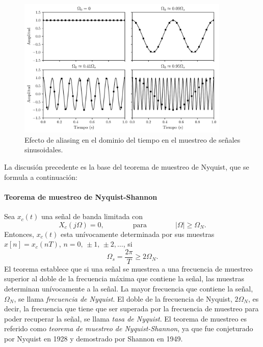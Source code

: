 \documentclass[a4paper]{report}
\begin{document}
\begin{figure}[!htb]
 \begin{center}
 \includegraphics[width=0.9\textwidth]{figuras/sampling_aliasing_sinusoid_time_domain.pdf}
 \caption{\label{fig:sampling_aliasing_sinusoid_time_domain} Efecto de aliasing en el dominio del tiempo en el muestreo de señales sinusoidales.}
 \end{center}
\end{figure} 

La discusión precedente es la base del teorema de muestreo de Nyquist, que se formula a continuación:

\paragraph{Teorema de muestreo de Nyquist-Shannon} Sea \(x_c(t)\) una señal de banda limitada con
\[
 X_c(j\Omega)=0,
 \qquad\qquad\textrm{para}\qquad\qquad
 |\Omega|\geq \Omega_N.
\]
Entonces, \(x_c(t)\) esta unívocamente determinada por sus muestras \(x[n]=x_c(nT)\), \(n=0,\,\pm1,\,\pm2,\dots\), si
\[
 \Omega_s=\frac{2\pi}{T}\geq 2\Omega_N.
\]
El teorema establece que si una señal se muestrea a una frecuencia de muestreo superior al doble de la frecuencia máxima que contiene la señal, las muestras determinan unívocamente a la señal. La mayor frecuencia que contiene la señal, \(\Omega_N\), se llama \emph{frecuencia de Nyquist}. El doble de la frecuencia de Nyquist, \(2\Omega_N\), es decir, la frecuencia que tiene que ser superada por la frecuencia de muestreo para poder recuperar la señal, se llama \emph{tasa de Nyquist}. El teorema de muestreo es referido como \emph{teorema de muestreo de Nyquist-Shannon}, ya que fue conjeturado por Nyquist en 1928 y demostrado por Shannon en 1949.
\end{document}
